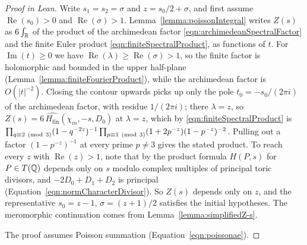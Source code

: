 \begin{proof}[Proof in Lean]

\leanok


Write $s_1=s_2=\sigma$ and $z=s_0/2+\sigma$, and first assume $\operatorname{Re}(s_0)>0$ and $\operatorname{Re}(\sigma)>1$. Lemma~\ref{lemma:poissonIntegral} writes $Z(s)$ as $6\int_{\mathbb{R}}$ of the product of the archimedean factor \eqref{eqn:archimedeanSpectralFactor} and the finite Euler product \eqref{eqn:finiteSpectralProduct}, as functions of $t$. For $\operatorname{Im}(t)\geq0$ we have $\operatorname{Re}(\lambda)\geq\operatorname{Re}(\sigma)>1$, so the finite factor is holomorphic and bounded in the upper half-plane (Lemma~\ref{lemma:finiteFourierProduct}), while the archimedean factor is $O(|t|^{-2})$. Closing the contour upwards picks up only the pole $t_0=-s_0/(2\pi i)$ of the archimedean factor, with residue $1/(2\pi i)$; there $\lambda=z$, so $Z(s)=6\,\widehat{H_{\mathrm{fin}}}(\chi_m,-s,D_0)$ at $\lambda=z$, which by \eqref{eqn:finiteSpectralProduct} is $\prod_{q\equiv2\ (\mathrm{mod}\ 3)}(1-q^{-2z})^{-1}\prod_{p\equiv1\ (\mathrm{mod}\ 3)}(1+2p^{-z})(1-p^{-z})^{-2}$. Pulling out a factor $(1-p^{-z})^{-1}$ at every prime $p\neq3$ gives the stated product. To reach every $z$ with $\operatorname{Re}(z)>1$, note that by the product formula $H(P,s)$ for $P\in T(\mathbb{Q})$ depends only on $s$ modulo complex multiples of principal toric divisors, and $-2D_0+D_1+D_2$ is principal (Equation~\ref{eqn:normCharacterDivisor}). So $Z(s)$ depends only on $z$, and the representative $s_0=z-1$, $\sigma=(z+1)/2$ satisfies the initial hypotheses. The meromorphic continuation comes from Lemma~\ref{lemma:simplifiedZ-s}.

The proof assumes Poisson summation (Equation~\ref{eqn:poissonae}).

\end{proof}

